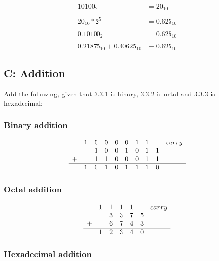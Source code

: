 \documentclass[12pt,a4paper]{article}
\begin{document}
\begin{align*}
10100_{2} &= 20_{10} \\
\\
20_{10} * 2^{5} &= 0.625_{10} \\
\\
0.10100_{2} &= 0.625_{10} \\
\\
0.21875_{10} + 0.40625_{10} &= 0.625_{10}
\end{align*}

\subsection{C: Addition}

Add the following, given that 3.3.1 is binary, 3.3.2 is octal and 3.3.3 is hexadecimal:

\subsubsection{Binary addition}

\begin{equation*}
\centering
\begin{array}{c c c c c c c c c c}
  & 1 & 0 & 0 & 0 & 0 & 1 & 1 &   & carry \\
  &   & 1 & 0 & 0 & 1 & 0 & 1 & 1 &       \\
+ &   & 1 & 1 & 0 & 0 & 0 & 1 & 1 &	      \\ \hline
  & 1 & 0 & 1 & 0 & 1 & 1 & 1 & 0 &
\end{array}
\end{equation*}

\subsubsection{Octal addition}

\begin{equation*}
\centering
\begin{array}{c c c c c c c}
  & 1 & 1 & 1 & 1 &   & carry \\
  &   & 3 & 3 & 7 & 5 &       \\
+ &   & 6 & 7 & 4 & 3 &       \\ \hline
  & 1 & 2 & 3 & 4 & 0 &
\end{array}
\end{equation*}

\subsubsection{Hexadecimal addition}
\end{document}
